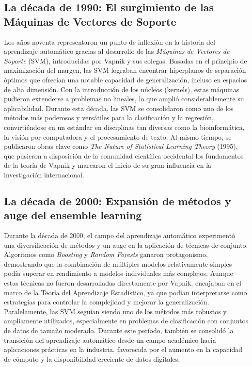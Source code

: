 \documentclass{report}
\begin{document}
\subsection{La década de 1990: El surgimiento de las Máquinas de Vectores de Soporte}

Los años noventa representaron un punto de inflexión en la historia del aprendizaje automático gracias al desarrollo de las \textit{Máquinas de Vectores de Soporte} (SVM), introducidas por Vapnik y sus colegas. Basadas en el principio de maximización del margen, las SVM lograban encontrar hiperplanos de separación óptimos que ofrecían una notable capacidad de generalización, incluso en espacios de alta dimensión. Con la introducción de los núcleos (kernels), estas máquinas pudieron extenderse a problemas no lineales, lo que amplió considerablemente su aplicabilidad. Durante esta década, las SVM se consolidaron como uno de los métodos más poderosos y versátiles para la clasificación y la regresión, convirtiéndose en un estándar en disciplinas tan diversas como la bioinformática, la visión por computadora y el procesamiento de texto. Al mismo tiempo, se publicaron obras clave como \textit{The Nature of Statistical Learning Theory} (1995), que pusieron a disposición de la comunidad científica occidental los fundamentos de la teoría de Vapnik y marcaron el inicio de su gran influencia en la investigación internacional.

\subsection{La década de 2000: Expansión de métodos y auge del ensemble learning}

Durante la década de 2000, el campo del aprendizaje automático experimentó una diversificación de métodos y un auge en la aplicación de técnicas de conjunto. Algoritmos como \textit{Boosting} y \textit{Random Forests} ganaron protagonismo, demostrando que la combinación de múltiples modelos relativamente simples podía superar en rendimiento a modelos individuales más complejos. Aunque estas técnicas no fueron desarrolladas directamente por Vapnik, encajaban en el marco de la Teoría del Aprendizaje Estadístico, ya que podían interpretarse como estrategias para controlar la complejidad y mejorar la generalización. Paralelamente, las SVM seguían siendo uno de los métodos más robustos y ampliamente utilizados, especialmente en problemas de clasificación con conjuntos de datos de tamaño moderado. Durante este período, también se consolidó la transición del aprendizaje automático desde un campo académico hacia aplicaciones prácticas en la industria, favorecida por el aumento en la capacidad de cómputo y la disponibilidad creciente de datos digitales.
\end{document}
